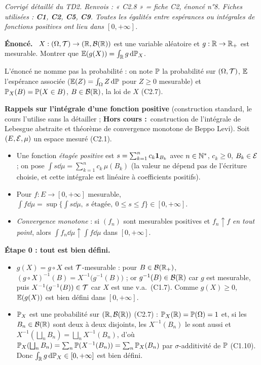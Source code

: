 \documentclass[11pt,a4paper]{article}
\newcommand{\question}[1]{\par\medskip\noindent\textbf{#1}~}
\newcommand{\HC}{\textbf{Hors cours :}~}
\begin{document}

\textit{Corrigé détaillé du TD2. Renvois : « C2.8 » = fiche C2, énoncé n°8. Fiches utilisées : \textbf{C1}, \textbf{C2},
\textbf{C5}, \textbf{C9}. Toutes les égalités entre espérances ou intégrales de fonctions positives ont lieu dans $[0,+\infty]$.}

\begin{exo}

\question{Énoncé.} $X:(\Omega,\mathcal{T})\to(\mathbb{R},\mathcal{B}(\mathbb{R}))$ est une variable aléatoire et $g:\mathbb{R}\to\mathbb{R}_+$ est mesurable.
Montrer que $\mathbb{E}(g(X))=\int_{\mathbb{R}} g\,\mathrm{d}\mathbb{P}_X$.

L'énoncé ne nomme pas la probabilité : on note $\mathbb{P}$ la probabilité sur $(\Omega,\mathcal{T})$, $\mathbb{E}$ l'espérance associée
($\mathbb{E}(Z)=\int_\Omega Z\,\mathrm{d}\mathbb{P}$ pour $Z\ge0$ mesurable) et $\mathbb{P}_X(B)=\mathbb{P}(X\in B)$, $B\in\mathcal{B}(\mathbb{R})$, la loi de $X$ (C2.7).

\textbf{Rappels sur l'intégrale d'une fonction positive} (construction standard, le cours l'utilise sans la détailler ; \HC construction de
l'intégrale de Lebesgue abstraite et théorème de convergence monotone de Beppo Levi). Soit $(E,\mathcal{E},\mu)$ un espace mesuré (C2.1).
\begin{itemize}
  \item Une fonction \emph{étagée positive} est $s=\sum_{k=1}^n c_k\mathbf{1}_{B_k}$ avec $n\in\mathbb{N}^*$, $c_k\ge0$, $B_k\in\mathcal{E}$ ;
  on pose $\int s\dd\mu=\sum_{k=1}^n c_k\,\mu(B_k)$ (la valeur ne dépend pas de l'écriture choisie, et cette intégrale est linéaire
  à coefficients positifs).
  \item Pour $f:E\to[0,+\infty]$ mesurable, $\int f\dd\mu=\sup\bigl\{\int s\dd\mu,\ s \text{ étagée},\ 0\le s\le f\bigr\}\in[0,+\infty]$.
  \item \emph{Convergence monotone} : si $(f_n)$ sont mesurables positives et $f_n\uparrow f$ \emph{en tout point}, alors
  $\int f_n\dd\mu\uparrow\int f\dd\mu$ dans $[0,+\infty]$.
\end{itemize}

\question{Étape 0 : tout est bien défini.}
\begin{itemize}
  \item $g(X)=g\circ X$ est $\mathcal{T}$-mesurable : pour $B\in\mathcal{B}(\mathbb{R}_+)$, $(g\circ X)^{-1}(B)=X^{-1}\bigl(g^{-1}(B)\bigr)$ ; or
  $g^{-1}(B)\in\mathcal{B}(\mathbb{R})$ car $g$ est mesurable, puis $X^{-1}(g^{-1}(B))\in\mathcal{T}$ car $X$ est une v.a.\ (C1.7). Comme $g(X)\ge0$,
  $\mathbb{E}(g(X))$ est bien défini dans $[0,+\infty]$.
  \item $\mathbb{P}_X$ est une probabilité sur $(\mathbb{R},\mathcal{B}(\mathbb{R}))$ (C2.7) : $\mathbb{P}_X(\mathbb{R})=\mathbb{P}(\Omega)=1$ et, si les $B_n\in\mathcal{B}(\mathbb{R})$ sont deux à deux disjoints,
  les $X^{-1}(B_n)$ le sont aussi et $X^{-1}(\bigsqcup_n B_n)=\bigsqcup_n X^{-1}(B_n)$, d'où
  $\mathbb{P}_X(\bigsqcup_n B_n)=\sum_n\mathbb{P}(X^{-1}(B_n))=\sum_n\mathbb{P}_X(B_n)$ par $\sigma$-additivité de $\mathbb{P}$ (C1.10).
  Donc $\int_{\mathbb{R}} g\,\mathrm{d}\mathbb{P}_X\in[0,+\infty]$ est bien défini.
\end{itemize}


\end{exo}
\end{document}
